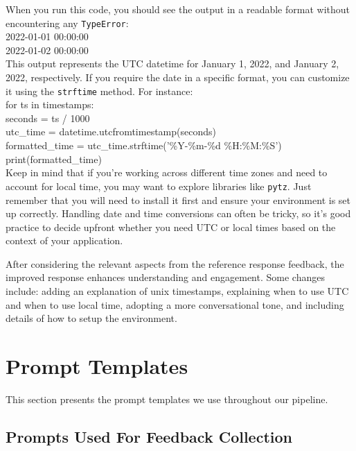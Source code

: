 \begin{promptbox}
When you run this code, you should see the output in a readable format without encountering any \texttt{TypeError}:\\

2022-01-01 00:00:00\\
2022-01-02 00:00:00\\

This output represents the UTC datetime for January 1, 2022, and January 2, 2022, respectively. If you require the date in a specific format, you can customize it using the \texttt{strftime} method. For instance:\\

for ts in timestamps:\\
    seconds = ts / 1000\\
    utc\_time = datetime.utcfromtimestamp(seconds)\\
    formatted\_time = utc\_time.strftime('\%Y-\%m-\%d \%H:\%M:\%S')\\
    print(formatted\_time)\\

Keep in mind that if you're working across different time zones and need to account for local time, you may want to explore libraries like \texttt{pytz}. Just remember that you will need to install it first and ensure your environment is set up correctly. Handling date and time conversions can often be tricky, so it's good practice to decide upfront whether you need UTC or local times based on the context of your application.

\end{promptbox}

After considering the relevant aspects from the reference response feedback, the improved response enhances understanding and engagement. Some changes include: adding an explanation of unix timestamps, explaining when to use UTC and when to use local time, adopting a more conversational tone, and including details of how to setup the environment.





\section{Prompt Templates}
\label{sec:appendix_prompt_templates}

This section presents the prompt templates we use throughout our pipeline.

\subsection{Prompts Used For Feedback Collection}

